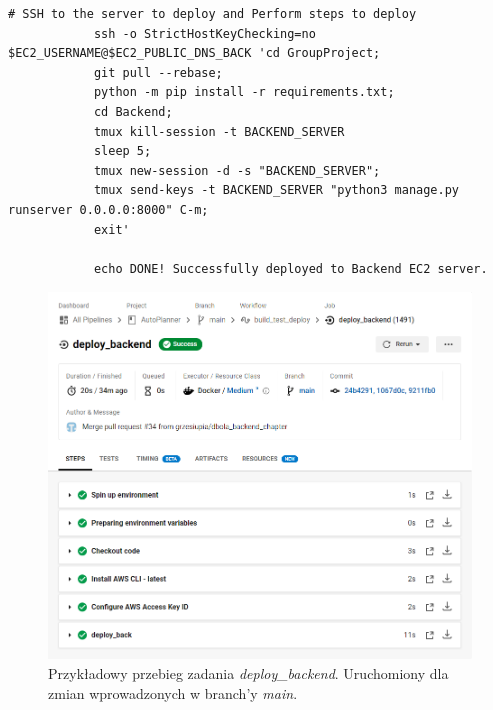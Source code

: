 \begin{itemize}
\begin{lstlisting}[caption=Część skryptu config.yml odpowiadająca za wykonanie zadania \textit{deploy\_backend}.]
            # SSH to the server to deploy and Perform steps to deploy
            ssh -o StrictHostKeyChecking=no $EC2_USERNAME@$EC2_PUBLIC_DNS_BACK 'cd GroupProject; 
            git pull --rebase;
            python -m pip install -r requirements.txt;
            cd Backend;
            tmux kill-session -t BACKEND_SERVER
            sleep 5;
            tmux new-session -d -s "BACKEND_SERVER";
            tmux send-keys -t BACKEND_SERVER "python3 manage.py runserver 0.0.0.0:8000" C-m;
            exit'

            echo DONE! Successfully deployed to Backend EC2 server.    
\end{lstlisting}
\newpage
\begin{figure}[H]
\centering\includegraphics[width=\textwidth]{figures/circleci_deploy_back}
\caption{Przykładowy przebieg zadania \textit{deploy\_backend}. Uruchomiony dla zmian wprowadzonych w branch'y \textit{main}.}
\end{figure}
\end{itemize}

